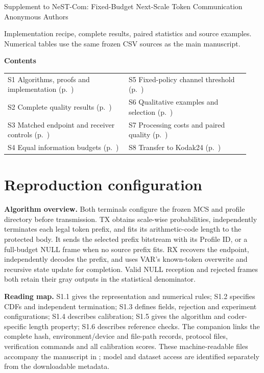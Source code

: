 \documentclass[10pt,letterpaper]{article}
\begin{document}
\begin{center}\Large Supplement to NeST-Com: Fixed-Budget Next-Scale Token Communication\\[4pt]\normalsize Anonymous Authors\end{center}
Implementation recipe, complete results, paired statistics and source examples. Numerical tables use the same frozen CSV sources as the main manuscript.

\textbf{Contents}\par
\begin{tabular}{@{}p{0.47\linewidth}p{0.47\linewidth}@{}}
S1 Algorithms, proofs and implementation (p.~\pageref{sup:1}) & S5 Fixed-policy channel threshold (p.~\pageref{sup:5})\\
S2 Complete quality results (p.~\pageref{sup:2}) & S6 Qualitative examples and selection (p.~\pageref{sup:6})\\
S3 Matched endpoint and receiver controls (p.~\pageref{sup:3}) & S7 Processing costs and paired quality (p.~\pageref{sup:7})\\
S4 Equal information budgets (p.~\pageref{sup:4}) & S8 Transfer to Kodak24 (p.~\pageref{sup:8})
\end{tabular}


\section{Reproduction configuration}\label{sup:1}
\textbf{Algorithm overview.} Both terminals configure the frozen MCS and profile directory before transmission. TX obtains scale-wise probabilities, independently terminates each legal token prefix, and fits its arithmetic-code length to the protected body. It sends the selected prefix bitstream with its Profile ID, or a full-budget NULL frame when no source prefix fits. RX recovers the endpoint, independently decodes the prefix, and uses VAR's known-token overwrite and recursive state update for completion. Valid NULL reception and rejected frames both retain their gray outputs in the statistical denominator.

\textbf{Reading map.} S1.1 gives the representation and numerical rules; S1.2 specifies CDFs and independent termination; S1.3 defines fields, rejection and experiment configurations; S1.4 describes calibration; S1.5 gives the algorithm and coder-specific length property; S1.6 describes reference checks. The companion  links the complete hash, environment/device and file-path records, protocol files, verification commands and all calibration scores. These machine-readable files accompany the manuscript in ; model and dataset access are identified separately from the downloadable metadata.
\end{document}
